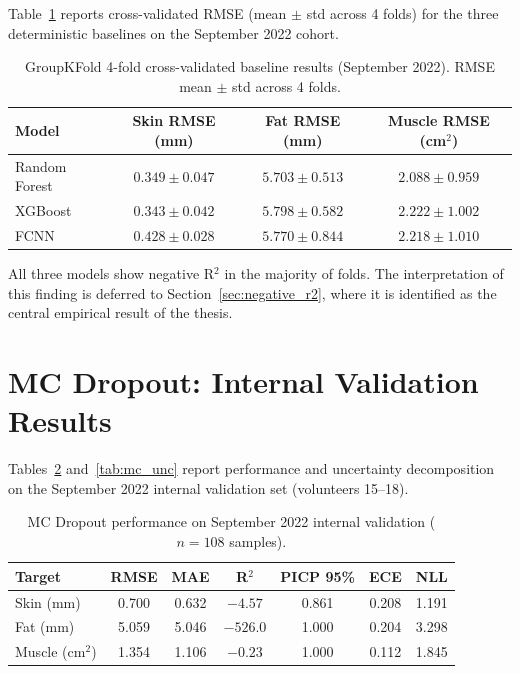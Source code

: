\documentclass[12pt, a4paper, oneside]{report}
\begin{document}
Table~\ref{tab:cv} reports cross-validated RMSE (mean $\pm$ std across 4 folds) for the three deterministic baselines on the September 2022 cohort.

\begin{table}[H]
  \centering
  \caption{GroupKFold 4-fold cross-validated baseline results (September 2022). RMSE mean $\pm$ std across 4 folds.}
  \label{tab:cv}
  \begin{tabular}{lccc}
    \toprule
    \textbf{Model} & \textbf{Skin RMSE (mm)} & \textbf{Fat RMSE (mm)} & \textbf{Muscle RMSE (cm$^2$)} \\
    \midrule
    Random Forest & $0.349 \pm 0.047$ & $5.703 \pm 0.513$ & $2.088 \pm 0.959$ \\
    XGBoost       & $0.343 \pm 0.042$ & $5.798 \pm 0.582$ & $2.222 \pm 1.002$ \\
    FCNN          & $0.428 \pm 0.028$ & $5.770 \pm 0.844$ & $2.218 \pm 1.010$ \\
    \bottomrule
  \end{tabular}
\end{table}

All three models show negative R$^2$ in the majority of folds. The interpretation of this finding is deferred to Section~\ref{sec:negative_r2}, where it is identified as the central empirical result of the thesis.

\section{MC Dropout: Internal Validation Results}

Tables~\ref{tab:mc_internal} and~\ref{tab:mc_unc} report performance and uncertainty decomposition on the September 2022 internal validation set (volunteers 15--18).

\begin{table}[H]
  \centering
  \caption{MC Dropout performance on September 2022 internal validation ($n=108$ samples).}
  \label{tab:mc_internal}
  \begin{tabular}{lcccccc}
    \toprule
    \textbf{Target} & \textbf{RMSE} & \textbf{MAE} & \textbf{R$^2$} & \textbf{PICP 95\%} & \textbf{ECE} & \textbf{NLL} \\
    \midrule
    Skin (mm)     & 0.700 & 0.632 & $-4.57$  & 0.861 & 0.208 & 1.191 \\
    Fat (mm)      & 5.059 & 5.046 & $-526.0$ & 1.000 & 0.204 & 3.298 \\
    Muscle (cm$^2$) & 1.354 & 1.106 & $-0.23$  & 1.000 & 0.112 & 1.845 \\
    \bottomrule
  \end{tabular}
\end{table}
\end{document}
